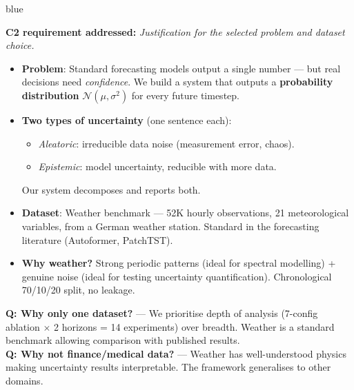 \documentclass[11pt,a4paper]{article}
\begin{document}
\begin{speakerbox}{blue}

\textbf{C2 requirement addressed:} \textit{Justification for the selected problem and dataset choice.}

\begin{talkingpoints}
\begin{itemize}[leftmargin=*]
    \item \textbf{Problem}: Standard forecasting models output a single number --- but real decisions need \emph{confidence}. We build a system that outputs a \textbf{probability distribution} $\mathcal{N}(\mu, \sigma^2)$ for every future timestep.
    \item \textbf{Two types of uncertainty} (one sentence each):
    \begin{itemize}
        \item \emph{Aleatoric}: irreducible data noise (measurement error, chaos).
        \item \emph{Epistemic}: model uncertainty, reducible with more data.
    \end{itemize}
    Our system decomposes and reports both.
    \item \textbf{Dataset}: Weather benchmark --- 52K hourly observations, 21 meteorological variables, from a German weather station. Standard in the forecasting literature (Autoformer, PatchTST).
    \item \textbf{Why weather?} Strong periodic patterns (ideal for spectral modelling) + genuine noise (ideal for testing uncertainty quantification). Chronological 70/10/20 split, no leakage.
\end{itemize}
\end{talkingpoints}

\begin{anticipatedqa}
\textbf{Q: Why only one dataset?} --- We prioritise depth of analysis (7-config ablation $\times$ 2 horizons = 14 experiments) over breadth. Weather is a standard benchmark allowing comparison with published results. \\
\textbf{Q: Why not finance/medical data?} --- Weather has well-understood physics making uncertainty results interpretable. The framework generalises to other domains.
\end{anticipatedqa}

\end{speakerbox}
\end{document}
